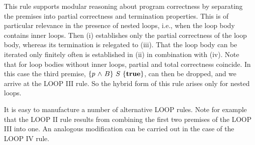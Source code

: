 \documentclass[runningheads]{llncs}       %
\begin{document}
This rule supports modular reasoning about program correctness
by separating the premises into partial correctness and termination
properties.  This is of particular relevance in the presence of nested
loops, i.e., when the loop body contains inner loops.  Then (i)
establishes only the partial correctness of the loop body, whereas its
termination is relegated to (iii). That the loop body can be iterated
only finitely often is established in (ii) in combination with (iv).
Note that for loop bodies without inner loops, partial and total
correctness coincide. In this case the third premise,
$\mbox{$\{{p \mbox{$\ \wedge\ $} B}\}\ {S}\ \{{\mathbf{true}}\}$}$, can then be dropped, and we arrive at
the LOOP III rule. So the hybrid form of this rule arises only for
nested loops.


It is easy to manufacture a number of alternative LOOP rules. 
Note for example that the LOOP II rule results from combining the first two
premises of the LOOP III into one.  An analogous modification can be
carried out in the case of the LOOP IV rule. 




\end{document}
